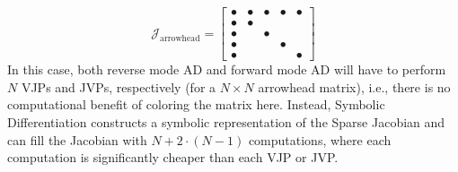 %
\begin{equation}
    \mathcal{J}_{\text{arrowhead}} = \begin{bmatrix}
        \bullet & \bullet & \bullet & \bullet & \bullet \\
        \bullet & \bullet &         &         &         \\
        \bullet &         & \bullet &         &         \\
        \bullet &         &         & \bullet &         \\
        \bullet &         &         &         & \bullet
    \end{bmatrix}
\end{equation}
%
In this case, both reverse mode AD and forward mode AD will have to perform $N$ VJPs and JVPs, respectively (for a $N \times N$ arrowhead matrix), i.e., there is no computational benefit of coloring the matrix here. Instead, Symbolic Differentiation constructs a symbolic representation of the Sparse Jacobian and can fill the Jacobian with $N + 2 \cdot (N - 1)$ computations, where each computation is significantly cheaper than each VJP or JVP.
